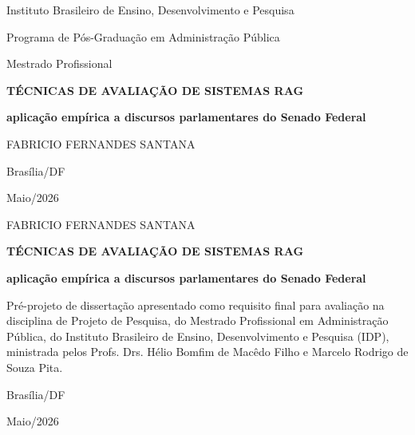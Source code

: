 \documentclass[12pt,a4paper]{article}
\newcommand{\instituicao}{Instituto Brasileiro de Ensino, Desenvolvimento e Pesquisa}
\newcommand{\programa}{Programa de Pós-Graduação em Administração Pública}
\newcommand{\nivel}{Mestrado Profissional}
\newcommand{\discente}{Fabricio Fernandes Santana}
\newcommand{\titulo}{Técnicas de avaliação de sistemas RAG}
\newcommand{\subtitulo}{aplicação empírica a discursos parlamentares do Senado Federal}
\newcommand{\local}{Brasília/DF}
\newcommand{\dataentrega}{Maio/2026}
\begin{document}
\hypersetup{pageanchor=false}

\begin{titlepage}
\begin{center}
\instituicao\par
\programa\par
\nivel\par

\vfill

{\bfseries\MakeUppercase{\titulo}}\par
\vspace{0.5cm}
{\bfseries\subtitulo}\par

\vfill

\MakeUppercase{\discente}\par

\vfill

\local\par
\dataentrega
\end{center}
\end{titlepage}

\begin{titlepage}
\begin{center}
\MakeUppercase{\discente}\par

\vfill

{\bfseries\MakeUppercase{\titulo}}\par
\vspace{0.5cm}
{\bfseries\subtitulo}\par

\vfill
\end{center}

\hfill
\begin{minipage}{0.52\textwidth}
Pré-projeto de dissertação apresentado como requisito final para avaliação na disciplina de Projeto de Pesquisa, do Mestrado Profissional em Administração Pública, do Instituto Brasileiro de Ensino, Desenvolvimento e Pesquisa (IDP), ministrada pelos Profs. Drs. Hélio Bomfim de Macêdo Filho e Marcelo Rodrigo de Souza Pita.
\end{minipage}

\vfill

\begin{center}
\local\par
\dataentrega
\end{center}
\end{titlepage}
\end{document}
